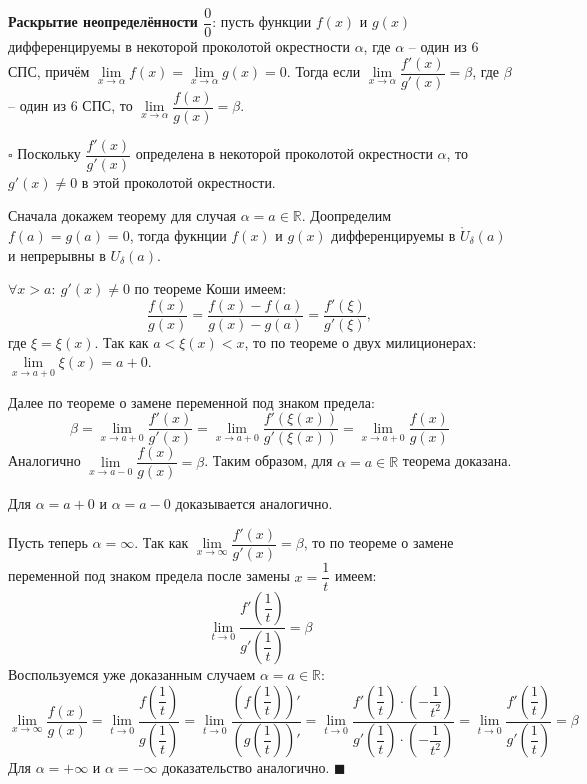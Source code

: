 \documentclass[12pt, a4paper, reqno]{article}
\begin{document}
    \textbf{Раскрытие неопределённости $\dfrac{0}{0}$}: пусть функции $f(x)$ и $g(x)$ дифференцируемы
    в некоторой проколотой окрестности $\alpha$, где $\alpha$ -- один из 6 СПС, причём
    $\lim\limits_{x\to\alpha} f(x) = \lim\limits_{x\to\alpha} g(x) = 0$. Тогда если
    $\lim\limits_{x\to\alpha} \dfrac{f'(x)}{g'(x)} = \beta$, где $\beta$ -- один из 6 СПС, то
    $\lim\limits_{x\to\alpha} \dfrac{f(x)}{g(x)} = \beta$.

    $\square$ Поскольку $\dfrac{f'(x)}{g'(x)}$ определена в некоторой проколотой окрестности $\alpha$,
    то $g'(x)\neq 0$ в этой проколотой окрестности.

    Сначала докажем теорему для случая $\alpha = a\in\mathbb{R}$. Доопределим $f(a) = g(a) = 0$,
    тогда фукнции $f(x)$ и  $g(x)$ дифференцируемы в $\mathring U_{\delta}(a)$ и непрерывны в
    $U_{\delta}(a)$.

    $\forall x > a:\ g'(x)\neq 0$ по теореме Коши имеем:
    \begin{equation*}
        \dfrac{f(x)}{g(x)} = \dfrac{f(x) - f(a)}{g(x) - g(a)} = \dfrac{f'(\xi)}{g'(\xi)},
    \end{equation*}
    где $\xi = \xi(x)$. Так как $a < \xi(x) < x$, то по теореме о двух милиционерах:
    $\lim\limits_{x\to a + 0} \xi(x) = a + 0$.

    Далее по теореме о замене переменной под знаком предела:
    \begin{equation*}
        \beta = \lim\limits_{x\to a + 0} \dfrac{f'(x)}{g'(x)} =
        \lim\limits_{x\to a + 0} \dfrac{f'(\xi(x))}{g'(\xi(x))} =
        \lim\limits_{x\to a + 0} \dfrac{f(x)}{g(x)}
    \end{equation*}
    Аналогично $\lim\limits_{x\to a - 0} \dfrac{f(x)}{g(x)} = \beta$. Таким образом, для
    $\alpha = a\in\mathbb{R}$ теорема доказана.

    Для $\alpha = a + 0$ и $\alpha = a - 0$ доказывается аналогично.

    Пусть теперь $\alpha = \infty$. Так как $\lim\limits_{x\to\infty} \dfrac{f'(x)}{g'(x)} = \beta$,
    то по теореме о замене переменной под знаком предела после замены $x = \dfrac{1}{t}$ имеем:
    \begin{equation*}
        \lim\limits_{t\to 0} \dfrac{f'\left(\dfrac{1}{t}\right)}{g'\left(\dfrac{1}{t}\right)} = \beta
    \end{equation*}
    Воспользуемся уже доказанным случаем $\alpha = a\in\mathbb{R}$:
    \begin{equation*}
        \lim\limits_{x\to\infty}\dfrac{f(x)}{g(x)} =
        \lim\limits_{t\to 0} \dfrac{f\left(\dfrac{1}{t}\right)}{g\left(\dfrac{1}{t}\right)} =
        \lim\limits_{t\to 0} \dfrac{\left(f\left(\dfrac{1}{t}\right)\right)'}
                                   {\left(g\left(\dfrac{1}{t}\right)\right)'} =
        \lim\limits_{t\to 0}\dfrac{f'\left(\dfrac{1}{t}\right)\cdot\left(-\dfrac{1}{t^2}\right)}
                                  {g'\left(\dfrac{1}{t}\right)\cdot\left(-\dfrac{1}{t^2}\right)} =
        \lim\limits_{t\to 0} \dfrac{f'\left(\dfrac{1}{t}\right)}{g'\left(\dfrac{1}{t}\right)} =
        \beta
    \end{equation*}
    Для $\alpha = +\infty$ и $\alpha = -\infty$ доказательство аналогично. $\blacksquare$
\end{document}
